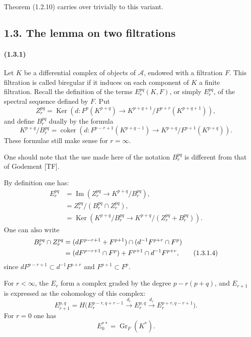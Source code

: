 \documentclass[10pt]{article}
\newcommand{\Gr}{\operatorname{Gr}}
\newcommand{\Ker}{\operatorname{Ker}}
\newcommand{\Imop}{\operatorname{Im}}
\newcommand{\coker}{\operatorname{coker}}
\newcommand{\calA}{\mathcal A}
\begin{document}
Theorem (1.2.10) carries over trivially to this variant.

\subsection*{1.3. The lemma on two filtrations}

\paragraph{(1.3.1)} Let $K$ be a differential complex of objects of $\calA$, endowed with a filtration $F$. This filtration is called biregular if it induces on each component of $K$ a finite filtration. Recall the definition of the terms $E_r^{pq}(K,F)$, or simply $E_r^{pq}$, of the spectral sequence defined by $F$. Put
\[
Z_r^{pq}=\Ker\left(d:F^p(K^{p+q})\to K^{p+q+1}/F^{p+r}(K^{p+q+1})\right),
\]
and define $B_r^{pq}$ dually by the formula
\[
K^{p+q}/B_r^{pq}=\coker\left(d:F^{p-r+1}(K^{p+q-1})\to K^{p+q}/F^{p+1}(K^{p+q})\right).
\]
These formulae still make sense for $r=\infty$.

One should note that the use made here of the notation $B_r^{pq}$ is different from that of Godement [TF].

By definition one has:
\begin{align}
E_r^{pq}&=\Imop\left(Z_r^{pq}\to K^{p+q}/B_r^{pq}\right), \tag{1.3.1.1}\\
&=Z_r^{pq}/(B_r^{pq}\cap Z_r^{pq}), \tag{1.3.1.2}\\
&=\Ker\left(K^{p+q}/B_r^{pq}\to K^{p+q}/(Z_r^{pq}+B_r^{pq})\right). \tag{1.3.1.3}
\end{align}
One can also write
\begin{align}
B_r^{pq}\cap Z_r^{pq}
&=(dF^{p-r+1}+F^{p+1})\cap(d^{-1}F^{p+r}\cap F^p) \notag\\
&=(dF^{p-r+1}\cap F^p)+F^{p+1}\cap d^{-1}F^{p+r}, \tag{1.3.1.4}
\end{align}
since $dF^{p-r+1}\subset d^{-1}F^{p+r}$ and $F^{p+1}\subset F^p$.


For $r<\infty$, the $E_r$ form a complex graded by the degree $p-r(p+q)$, and $E_{r+1}$ is expressed as the cohomology of this complex:
\[
\tag{1.3.1.5}
E_{r+1}^{p,q}=H\bigl(E_r^{p-r,q+r-1}\xrightarrow{d_r}E_r^{p,q}\xrightarrow{d_r}E_r^{p+r,q-r+1}\bigr).
\]
For $r=0$ one has
\[
\tag{1.3.1.6}
E_0^{**}=\Gr_F(K^*).
\]
\end{document}
